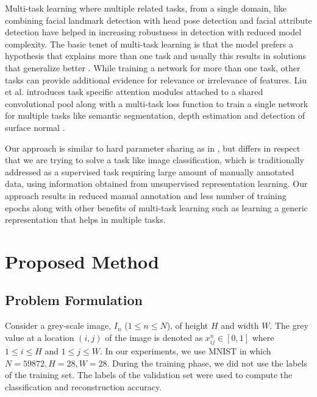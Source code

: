 \documentclass{uai2021} %
\begin{document}
Multi-task learning where multiple related tasks, from a single domain, like combining facial landmark detection with head pose detection and facial attribute detection \cite{zhang2014facial} have helped in increasing robustness in detection with reduced model complexity.
The basic tenet of multi-task learning is that the model prefers a hypothesis that explains more than one task and usually this results in solutions that generalize better \cite{ruder2017overview}.
While training a network for more than one task, other tasks can provide additional evidence for relevance or irrelevance of features.
Liu et al. introduces task specific attention modules attached to a shared convolutional pool  along with a multi-task loss function to train a single network for multiple tasks like semantic segmentation, depth estimation and detection of surface normal \cite{liu2019end}.

Our approach is similar to hard parameter sharing as in \cite{zhang2014facial} \cite{dai2016instance}, but differs in respect that we are trying to solve a task like image classification, which is traditionally addressed as a supervised task requiring large amount of manually annotated data, using information obtained from  unsupervised representation learning.
Our approach results in reduced manual annotation and less number of training epochs along with other benefits of multi-task learning such as learning a generic representation that helps in multiple tasks.


\section{Proposed Method} \label{proposed_method}

\subsection{Problem Formulation} \label{problem_formulation}
Consider a grey-scale image, $I_n$  ($1\leq n \leq N$),  of height  $H$ and width $W$. The grey value at a location $(i, j)$ of the image is denoted  as $x_{ij}^{n} \in [0,1]$  where $1 \leq i \leq H$  and  $1\leq j \leq W$.
In our experiments, we use MNIST in which $N= 59872, H=28,  W= 28$. During the training phase, we did not use the labels of the training set.
The labels of the validation set were used to compute the classification and reconstruction accuracy.
\end{document}
